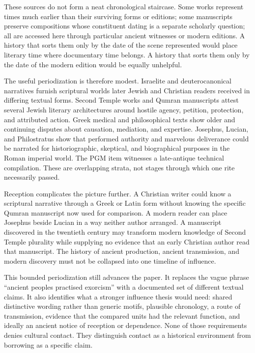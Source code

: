 These sources do not form a neat chronological staircase. Some works represent
times much earlier than their surviving forms or editions; some manuscripts
preserve compositions whose constituent dating is a separate scholarly
question; all are accessed here through particular ancient witnesses or modern
editions. A history that sorts them only by the date of the scene represented
would place literary time where documentary time belongs. A history that sorts
them only by the date of the modern edition would be equally unhelpful.

The useful periodization is therefore modest. Israelite and deuterocanonical
narratives furnish scriptural worlds later Jewish and Christian readers
received in differing textual forms. Second Temple works and Qumran
manuscripts attest several Jewish literary architectures around hostile agency,
petition, protection, and attributed action. Greek medical and philosophical
texts show older and continuing disputes about causation, mediation, and
expertise. Josephus, Lucian, and Philostratus show that performed authority and
marvelous deliverance could be narrated for historiographic, skeptical, and
biographical purposes in the Roman imperial world. The PGM item witnesses a
late-antique technical compilation. These are overlapping strata, not stages
through which one rite necessarily passed.

Reception complicates the picture further. A Christian writer could know a
scriptural narrative through a Greek or Latin form without knowing the
specific Qumran manuscript now used for comparison. A modern reader can place
Josephus beside Lucian in a way neither author arranged. A manuscript
discovered in the twentieth century may transform modern knowledge of Second
Temple plurality while supplying no evidence that an early Christian author
read that manuscript. The history of ancient production, ancient
transmission, and modern discovery must not be collapsed into one timeline of
influence.

This bounded periodization still advances the paper. It replaces the vague
phrase ``ancient peoples practised exorcism'' with a documented set of
different textual claims. It also identifies what a stronger influence thesis
would need: shared distinctive wording rather than generic motifs, plausible
chronology, a route of transmission, evidence that the compared units had the
relevant function, and ideally an ancient notice of reception or dependence.
None of those requirements denies cultural contact. They distinguish contact
as a historical environment from borrowing as a specific claim.

